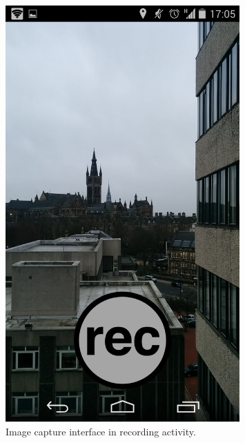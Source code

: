 \documentclass{l3proj}
\begin{document}
\newpage
\begin{figure}[ht!]
\centering
\includegraphics[width=0.8\textwidth]{images/record-screen-final.png}
\caption{Image capture interface in recording activity.}
\end{figure}
\end{document}
